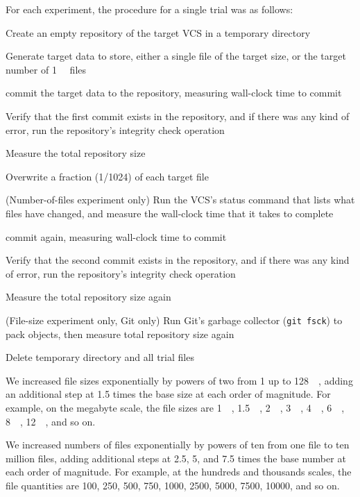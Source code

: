 For each experiment, the procedure for a single trial was as follows:
\begin{tight_enumerate}
    \item Create an empty \gls{repository} of the target \gls{VCS} in a temporary directory
    \item Generate target data to store, either a single file of the target size, or the target number of \SI{1}{\kibi\byte} files
    \item \Gls{commit} the target data to the \gls{repository}, measuring wall-clock time to \gls{commit}
    \item Verify that the first \gls{commit} exists in the \gls{repository}, and if there was any kind of error, run the \gls{repository}'s integrity check operation
    \item Measure the total \gls{repository} size
    \item Overwrite a fraction (\num{1/1024}) of each target file
    \item (Number-of-files experiment only) Run the \gls{VCS}'s status command that lists what files have changed, and measure the wall-clock time that it takes to complete
    \item \Gls{commit} again, measuring wall-clock time to \gls{commit}
    \item Verify that the second \gls{commit} exists in the \gls{repository}, and if there was any kind of error, run the \gls{repository}'s integrity check operation
    \item Measure the total \gls{repository} size again
    \item (File-size experiment only, Git only) Run Git's garbage collector (\lstinline{git fsck}) to pack objects, then measure total \gls{repository} size again
    \item Delete temporary directory and all trial files
\end{tight_enumerate}

We increased file sizes exponentially by powers of two from \SI{1}{\byte} up to \SI{128}{\gibi\byte}, adding an additional step at \num{1.5} times the base size at each order of magnitude.
For example, on the megabyte scale, the file sizes are \SI{1}{\mebi\byte}, \SI{1.5}{\mebi\byte}, \SI{2}{\mebi\byte}, \SI{3}{\mebi\byte}, \SI{4}{\mebi\byte}, \SI{6}{\mebi\byte}, \SI{8}{\mebi\byte}, \SI{12}{\mebi\byte}, and so on.

We increased numbers of files exponentially by powers of ten from one file to ten million files, adding additional steps at \num{2.5}, \num{5}, and \num{7.5} times the base number at each order of magnitude.
For example, at the hundreds and thousands scales, the file quantities are \num{100}, \num{250}, \num{500}, \num{750}, \num{1000}, \num{2500}, \num{5000}, \num{7500}, \num{10000}, and so on.

